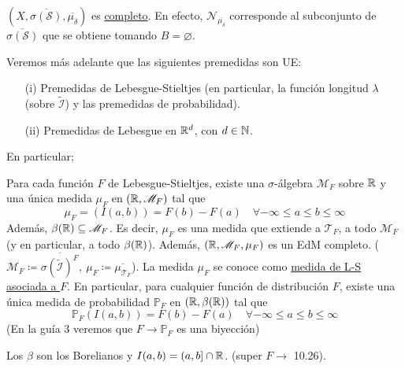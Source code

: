 \begin{remark}
	$(X,\overline{\sigma(\mathscr{S})},\overline{\mu_{\delta}})$ es \underline{completo}. En efecto, $\mathscr{N}_{\overline{\mu_{\delta}}}$ corresponde al subconjunto de $\overline{\sigma(\mathscr{S})}$ que se obtiene tomando $B=\varnothing$.
\end{remark}

\begin{remark}
	Veremos más adelante que las siguientes premedidas son UE:

	\begin{itemize}
		\item[(i)] Premedidas de Lebesgue-Stieltjes (en particular, la función longitud $\lambda$ (sobre $\widetilde{\mathcal{I}}$) y las premedidas de probabilidad).

		\item[(ii)] Premedidas de Lebesgue en $\mathbb{R}^d$, con $d \in \mathbb{N}$.
	\end{itemize}
\end{remark}

\noindent En particular;

\begin{corollary}
	Para cada función $F$ de Lebesgue-Stieltjes, existe una $\sigma$-álgebra $\mathscr{M}_F$ sobre $\mathbb{R}$ y una única medida $\mu_F$ en $(\mathbb{R},\mathscr{M}_F)$ tal que
	\[ \mu_F = (I(a,b)) = F(b) - F(a) \quad \forall -\infty \leq a \leq b \leq \infty \]
	Además, $\beta(\mathbb{R}) \subseteq \mathscr{M}_F$. Es decir, $\mu_F$ es una medida que extiende a $\mathcal{T}_F$, a todo $\mathscr{M}_F$ (y en particular, a todo $\beta(\mathbb{R})$). Además, $(\mathbb{R}, \mathscr{M}_F, \mu_F)$ es un EdM completo. ($\mathscr{M}_F \coloneq \overline{\sigma(\widetilde{\mathcal{I}})^F},\ \mu_F \coloneq \overline{\mu_{\mathcal{T}_F}}$). La medida $\mu_F$ se conoce como \underline{medida de L-S asociada a $F$}. En particular, para cualquier función de distribución $F$, existe una única medida de probabilidad $\mathbb{P}_F$ en $(\mathbb{R},\beta(\mathbb{R}))$ tal que 
	\[ \mathbb{P}_F(I(a,b)) = F(b) - F(a) \quad \forall -\infty \leq a \leq b \leq \infty \]
	(En la guía 3 veremos que $F \to \mathbb{P}_F$ es una biyección)
\end{corollary}

\begin{note}
	Los $\beta$ son los Borelianos y $I(a,b) = (a,b] \cap \mathbb{R}$. (super $F \to$ 10.26).
\end{note}

